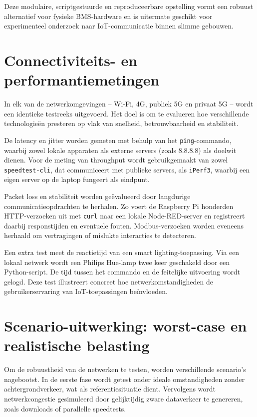 Deze modulaire, scriptgestuurde en reproduceerbare opstelling vormt een robuust alternatief voor fysieke BMS-hardware en is uitermate geschikt voor experimenteel onderzoek naar IoT-communicatie binnen slimme gebouwen.

\section{Connectiviteits- en performantiemetingen}

In elk van de netwerkomgevingen – Wi-Fi, 4G, publiek 5G en privaat 5G – wordt een identieke testreeks uitgevoerd. Het doel is om te evalueren hoe verschillende technologieën presteren op vlak van snelheid, betrouwbaarheid en stabiliteit. 

De latency en jitter worden gemeten met behulp van het \texttt{ping}-commando, waarbij zowel lokale apparaten als externe servers (zoals 8.8.8.8) als doelwit dienen. Voor de meting van throughput wordt gebruikgemaakt van zowel \texttt{speedtest-cli}, dat communiceert met publieke servers, als \texttt{iPerf3}, waarbij een eigen server op de laptop fungeert als eindpunt.

Packet loss en stabiliteit worden geëvalueerd door langdurige communicatieopdrachten te herhalen. Zo voert de Raspberry Pi honderden HTTP-verzoeken uit met \texttt{curl} naar een lokale Node-RED-server en registreert daarbij responstijden en eventuele fouten. Modbus-verzoeken worden eveneens herhaald om vertragingen of mislukte interacties te detecteren.

Een extra test meet de reactietijd van een smart lighting-toepassing. Via een lokaal netwerk wordt een Philips Hue-lamp twee keer geschakeld door een Python-script. De tijd tussen het commando en de feitelijke uitvoering wordt gelogd. Deze test illustreert concreet hoe netwerkomstandigheden de gebruikerservaring van IoT-toepassingen beïnvloeden.

\section{Scenario-uitwerking: worst-case en realistische belasting}

Om de robuustheid van de netwerken te testen, worden verschillende scenario’s nagebootst. In de eerste fase wordt getest onder ideale omstandigheden zonder achtergrondverkeer, wat als referentiesituatie dient. Vervolgens wordt netwerkcongestie gesimuleerd door gelijktijdig zware dataverkeer te genereren, zoals downloads of parallelle speedtests.

